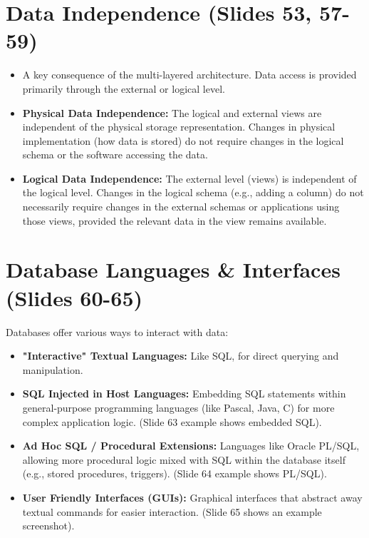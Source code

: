 \documentclass{article}
\begin{document}
	\section{Data Independence (Slides 53, 57-59)}
	\begin{itemize}
		\item A key consequence of the multi-layered architecture. Data access is provided primarily through the external or logical level.
		\item \textbf{Physical Data Independence:} The logical and external views are independent of the physical storage representation. Changes in physical implementation (how data is stored) do not require changes in the logical schema or the software accessing the data.
		\item \textbf{Logical Data Independence:} The external level (views) is independent of the logical level. Changes in the logical schema (e.g., adding a column) do not necessarily require changes in the external schemas or applications using those views, provided the relevant data in the view remains available.
	\end{itemize}
	
	\section{Database Languages \& Interfaces (Slides 60-65)}
	Databases offer various ways to interact with data:
	\begin{itemize}
		\item \textbf{"Interactive" Textual Languages:} Like SQL, for direct querying and manipulation.
		\item \textbf{SQL Injected in Host Languages:} Embedding SQL statements within general-purpose programming languages (like Pascal, Java, C) for more complex application logic. (Slide 63 example shows embedded SQL).
		\item \textbf{Ad Hoc SQL / Procedural Extensions:} Languages like Oracle PL/SQL, allowing more procedural logic mixed with SQL within the database itself (e.g., stored procedures, triggers). (Slide 64 example shows PL/SQL).
		\item \textbf{User Friendly Interfaces (GUIs):} Graphical interfaces that abstract away textual commands for easier interaction. (Slide 65 shows an example screenshot).
	\end{itemize}
	
\end{document}
